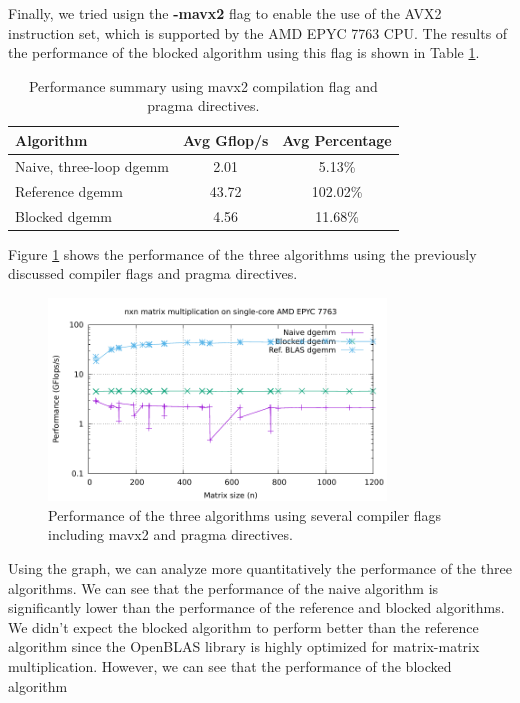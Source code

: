 \documentclass[unicode,11pt,a4paper,oneside,numbers=endperiod,openany]{scrartcl}
\begin{document}
Finally, we tried usign the \textbf{-mavx2} flag to enable the use of the AVX2 instruction set, which is supported by the
AMD EPYC 7763 CPU.
The results of the performance of the blocked algorithm using this flag is shown in 
Table \ref{tab:performance_summary_pragmas_mavx2}.
\begin{table}[htbp]
    \centering
    \caption{Performance summary using mavx2 compilation flag and pragma directives.}
    \begin{tabular}{||lcc||}
    \hline
    Algorithm & Avg Gflop/s & Avg Percentage \\
    \hline
    \hline
    Naive, three-loop dgemm & 2.01 & 5.13\% \\
    Reference dgemm & 43.72 & 102.02\% \\
    Blocked dgemm & 4.56 & 11.68\% \\
    \hline
    \end{tabular}\label{tab:performance_summary_pragmas_mavx2}
\end{table}
Figure \ref{fig:performance_mavx2} shows the performance of the three algorithms using the previously discussed compiler flags and 
pragma directives.
\begin{figure}[htbp]
    \centering
    \includegraphics[width=0.8\textwidth]{../matrix_mult/timing_mavx2.pdf}
    \caption{Performance of the three algorithms using several compiler flags including mavx2 and pragma directives.}
\label{fig:performance_mavx2}
\end{figure}
Using the graph, we can analyze more quantitatively the performance of the three algorithms. We can see that 
the performance of the naive algorithm is significantly lower than the performance of the reference and blocked algorithms.
We didn't expect the blocked algorithm to perform better than the reference algorithm since the OpenBLAS library is
highly optimized for matrix-matrix multiplication. However, we can see that the performance of the blocked algorithm
\end{document}
